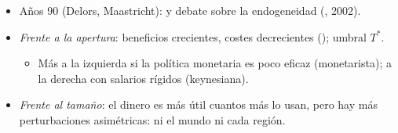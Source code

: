 \documentclass{article}
\begin{document}
\begin{columnas}
\begin{itemize}
\item Años 90 (Delors, Maastricht):  y debate sobre la endogeneidad (, 2002).
\item \emph{Frente a la apertura}: beneficios crecientes, costes decrecientes (); umbral $T^*$.
  \begin{itemize}
  \item Más a la izquierda si la política monetaria es poco eficaz (monetarista); a la derecha con salarios rígidos (keynesiana).
  \end{itemize}
\item \emph{Frente al tamaño}: el dinero es más útil cuantos más lo usan, pero hay más perturbaciones asimétricas: ni el mundo ni cada región.
\end{itemize}


\end{columnas}
\end{document}
